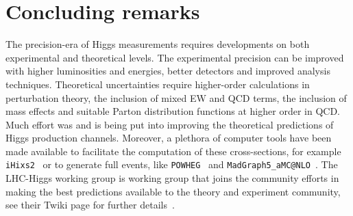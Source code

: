 \section{Concluding remarks \label{sec:singlehiggsconc}  }
\par The precision-era of Higgs measurements requires developments on both experimental and theoretical levels. The experimental precision can be improved with higher luminosities and energies, better detectors and improved analysis techniques. Theoretical uncertainties require higher-order calculations in perturbation theory, the inclusion of mixed EW and QCD terms, the inclusion of mass effects and suitable Parton distribution functions at higher order in QCD.  Much effort was and is being put into improving the theoretical predictions of Higgs production channels. Moreover, a plethora of computer tools have been made available to facilitate the computation of these cross-sections, for example  \texttt{iHixs2}~\cite{Dulat:2018rbf} or to generate full events, like \texttt{POWHEG}~\cite{Alioli:2008tz,Nason:2009ai,Bagnaschi:2011tu,Campbell:2012am,Luisoni:2013cuh,Jager:2014vna,Hartanto:2015uka} and \texttt{MadGraph5\_aMC@NLO}~\cite{Alwall:2014hca}. The LHC-Higgs working group is working group that joins the community efforts in making the best predictions available to the theory and experiment community, see their Twiki page for further details~\cite{HXSWG}. 

